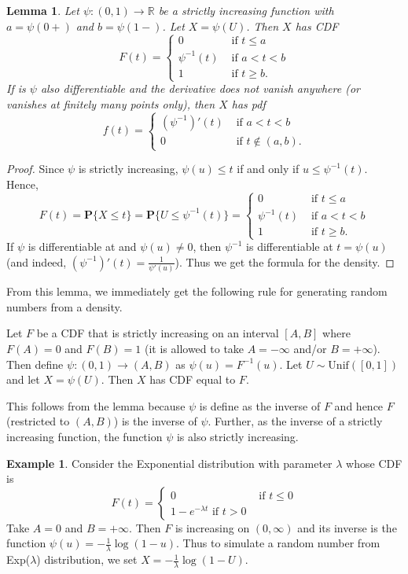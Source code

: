 \documentclass[preprint,  11pt]{amsart}
\newcommand{\para}[1]{\vspace{4mm}\noindent{\bfseries #1:}}
\theoremstyle{plain} %
\newtheorem{lemma}[theorem]{Lemma}
\theoremstyle{definition} %
\newtheorem{example}[theorem]{Example}
\begin{document}
{{{{{{{{{{{{{{{{{{{\begin{lemma} Let $\psi:(0,1)\rightarrow \mathbb{R}$ be a  strictly increasing function with $a=\psi(0+)$ and $b=\psi(1-)$. Let $X=\psi(U)$. Then $X$ has CDF
$$
F(t)=\begin{cases} 0 & \mbox{ if }t\le a \\ \psi^{-1}(t) & \mbox{ if }a<t<b \\ 1 & \mbox{ if }t\ge b. \end{cases}
$$
If is $\psi$  also differentiable and the derivative does not vanish anywhere (or vanishes at finitely many points only), then $X$ has pdf
$$
f(t)=\begin{cases} \left(\psi^{-1}\right)'(t) & \mbox{ if }a<t<b\\ 0 & \mbox{ if }t\not\in (a,b). \end{cases}
$$
\end{lemma}
\begin{proof} Since $\psi$ is strictly increasing, $\psi(u)\le t$ if and only if $u\le \psi^{-1}(t)$. Hence,
$$
F(t)=\mathbf{P}\{X\le t\} = \mathbf{P}\{U\le \psi^{-1}(t)\} = \begin{cases} 0 & \mbox{ if }t\le a \\ \psi^{-1}(t) & \mbox{ if }a<t<b \\ 1 & \mbox{ if }t\ge b. \end{cases}
$$
If $\psi$ is differentiable at and $\psi(u)\not=0$, then $\psi^{-1}$ is differentiable at $t=\psi(u)$ (and indeed, $(\psi^{-1})'(t)=\frac{1}{\psi'(u)}$). Thus we get the formula for the density.
\end{proof}

From this lemma, we immediately get the following rule for generating random numbers from a density.

\para{How to simulate from a CDF} Let $F$ be a CDF that is strictly increasing on an interval $[A,B]$ where $F(A)=0$ and $F(B)=1$ (it is allowed to take $A=-\infty$ and/or $B=+\infty$). Then define $\psi:(0,1)\rightarrow (A,B)$ as $\psi(u)=F^{-1}(u)$. Let $U\sim \mbox{Unif}([0,1])$ and let $X=\psi(U)$. Then $X$ has CDF equal to $F$.

This follows from the lemma because $\psi$ is define as the inverse of $F$ and hence $F$ (restricted to $(A,B)$) is the inverse of $\psi$. Further, as the inverse of a strictly increasing function, the function $\psi$  is also strictly increasing.

\begin{example} Consider the Exponential distribution with parameter $\lambda$ whose CDF is
$$
F(t)=\begin{cases} 0 & \mbox{ if }t\le 0 \\ 1-e^{-\lambda t} \mbox{ if }t>0 \end{cases}
$$ Take $A=0$ and $B=+\infty$. Then $F$ is increasing on $(0,\infty)$ and its inverse is the function $\psi(u)=-\frac{1}{\lambda}\log(1-u)$. Thus to simulate a random number from Exp($\lambda$) distribution, we set $X=-\frac{1}{\lambda}\log(1-U)$.
\end{example}

}}}}}}}}}}}}}}}}}}}
\end{document}
